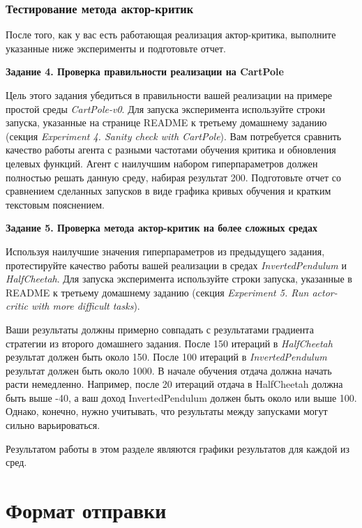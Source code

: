 \documentclass[12pt, oneside]{article}
\begin{document}
\subsubsection{Тестирование метода актор-критик}

После того, как у вас есть работающая реализация актор-критика, выполните указанные ниже эксперименты и подготовьте отчет.

\textbf{Задание 4. Проверка правильности реализации на CartPole}

Цель этого задания убедиться в правильности вашей реализации на примере простой среды \textit{CartPole-v0}. Для запуска эксперимента используйте строки запуска, указанные на странице README к третьему домашнему заданию (секция \textit{Experiment 4. Sanity check with CartPole}). Вам потребуется сравнить качество работы агента с разными частотами обучения критика и обновления целевых функций. Агент с наилучшим набором гиперпараметров должен полностью решать данную среду, набирая результат 200. Подготовьте отчет со сравнением сделанных запусков в виде графика кривых обучения и кратким текстовым пояснением.

\textbf{Задание 5. Проверка метода актор-критик на более сложных средах}

Используя наилучшие значения гиперпараметров из предыдущего задания, протестируйте качество работы вашей реализации в средах \textit{InvertedPendulum} и \textit{HalfCheetah}. Для запуска эксперимента используйте строки запуска, указанные в README к третьему домашнему заданию (секция \textit{Experiment 5. Run actor-critic with more difficult tasks}).

Ваши результаты должны примерно совпадать с результатами градиента стратегии из второго домашнего задания. После 150 итераций в \textit{HalfCheetah} результат должен быть около 150. После 100 итераций в \textit{InvertedPendulum} результат должен быть около 1000. В начале обучения отдача должна начать расти немедленно. Например, после 20 итераций отдача в HalfCheetah должна быть выше -40, а ваш доход InvertedPendulum должен быть около или выше 100. Однако, конечно, нужно учитывать, что результаты между запусками могут сильно варьироваться.

Результатом работы в этом разделе являются графики результатов для каждой из сред.


\section{Формат отправки}
\end{document}
